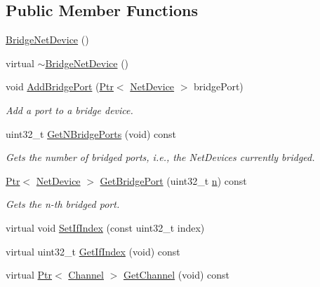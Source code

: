\subsection*{Public Member Functions}
\begin{DoxyCompactItemize}
\item 
\hyperlink{classns3_1_1BridgeNetDevice_ab113a3cc0394ab89479fbdae8c21c27a}{Bridge\+Net\+Device} ()
\item 
virtual \hyperlink{classns3_1_1BridgeNetDevice_ab94b1e287fdec3d21ea0bf485244825e}{$\sim$\+Bridge\+Net\+Device} ()
\item 
void \hyperlink{classns3_1_1BridgeNetDevice_a963a535726ea5c94e2258825d0de260a}{Add\+Bridge\+Port} (\hyperlink{classns3_1_1Ptr}{Ptr}$<$ \hyperlink{classns3_1_1NetDevice}{Net\+Device} $>$ bridge\+Port)
\begin{DoxyCompactList}\small\item\em Add a \textquotesingle{}port\textquotesingle{} to a bridge device. \end{DoxyCompactList}\item 
uint32\+\_\+t \hyperlink{classns3_1_1BridgeNetDevice_a93fbb63deb6803390b53cf537ac66a2d}{Get\+N\+Bridge\+Ports} (void) const 
\begin{DoxyCompactList}\small\item\em Gets the number of bridged \textquotesingle{}ports\textquotesingle{}, i.\+e., the Net\+Devices currently bridged. \end{DoxyCompactList}\item 
\hyperlink{classns3_1_1Ptr}{Ptr}$<$ \hyperlink{classns3_1_1NetDevice}{Net\+Device} $>$ \hyperlink{classns3_1_1BridgeNetDevice_ada7284f361adefebb72364c61446ed05}{Get\+Bridge\+Port} (uint32\+\_\+t \hyperlink{lte__link__budget__x2__handover__measures_8m_abdb05bc5a064cf642a06c83b3392f148}{n}) const 
\begin{DoxyCompactList}\small\item\em Gets the n-\/th bridged port. \end{DoxyCompactList}\item 
virtual void \hyperlink{classns3_1_1BridgeNetDevice_a94fe34b7074a4ac12cb3ae8f3272d1e1}{Set\+If\+Index} (const uint32\+\_\+t index)
\item 
virtual uint32\+\_\+t \hyperlink{classns3_1_1BridgeNetDevice_a7e7679e8e284072bb9fc1a950ca57594}{Get\+If\+Index} (void) const 
\item 
virtual \hyperlink{classns3_1_1Ptr}{Ptr}$<$ \hyperlink{classns3_1_1Channel}{Channel} $>$ \hyperlink{classns3_1_1BridgeNetDevice_ae40842a4c4b32ba6c39381e65e71320e}{Get\+Channel} (void) const 

\end{DoxyCompactItemize}
